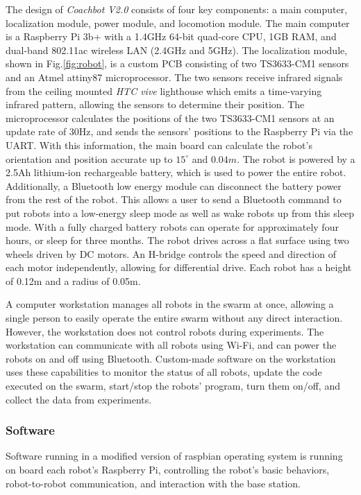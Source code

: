 \documentclass[journal]{IEEEtran}
\begin{document}
The design of \textit{Coachbot V2.0} consists of four key components: a main computer, localization module, power module, and locomotion module. The main computer is a Raspberry Pi 3b+ with a 1.4GHz 64-bit quad-core CPU, 1GB RAM, and dual-band 802.11ac wireless LAN (2.4GHz and 5GHz). The localization module, shown in Fig.\ref{fig:robot}, is a custom PCB consisting of two TS3633-CM1 sensors and an Atmel attiny87 microprocessor.  The two sensors receive infrared signals from the ceiling mounted \textit{HTC vive} lighthouse which emits a time-varying infrared pattern, allowing the sensors to determine their position.  The microprocessor calculates the positions of the two TS3633-CM1 sensors at an update rate of 30Hz, and sends the sensors' positions to the Raspberry Pi via the UART.  With this information, the main board can calculate the robot's orientation and position accurate up to $15^{\circ}$ and $0.04m$. The robot is powered by a 2.5Ah lithium-ion rechargeable battery, which is used to power the entire robot.  Additionally, a Bluetooth low energy module can disconnect the battery power from the rest of the robot.  This allows a user to send a Bluetooth command to put robots into a low-energy sleep mode as well as wake robots up from this sleep mode. With a fully charged battery robots can operate for approximately four hours, or sleep for three months. The robot drives across a flat surface using two wheels driven by DC motors.  An H-bridge controls the speed and direction of each motor independently, allowing for differential drive. Each robot has a height of 0.12m and a radius of 0.05m. 

A computer workstation manages all robots in the swarm at once, allowing a single person to easily operate the entire swarm without any direct interaction. However, the workstation does not control robots during experiments. The workstation can communicate with all robots using Wi-Fi, and can power the robots on and off using Bluetooth. Custom-made software on the workstation uses these capabilities to monitor the status of all robots, update the code executed on the swarm, start/stop the robots' program, turn them on/off, and collect the data from experiments.


\subsubsection{Software}
Software running in a modified version of raspbian operating system is running on board each robot's Raspberry Pi, controlling the robot's basic behaviors, robot-to-robot communication, and interaction with the base station. 
\end{document}
